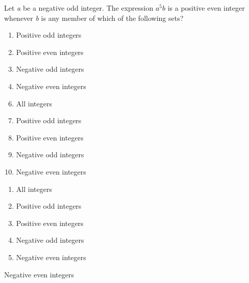 Let \textit{a} be a negative odd integer. The expression $\textit{a}^5\textit{b}$ is a positive even integer whenever \textit{b} is any member of which of the following sets?

\ifsat
	\begin{enumerate}[label=\Alph*)]
		\item  Positive odd integers
		\item  Positive even integers 
		\item  Negative odd integers
		\item  Negative even integers %
	\end{enumerate}
\else
\fi

\ifacteven
	\begin{enumerate}[label=\textbf{\Alph*.},itemsep=\fill,align=left]
		\setcounter{enumii}{5}
		\item   All integers
		\item  Positive odd integers
		\item  Positive even integers 
		\addtocounter{enumii}{1}
		\item  Negative odd integers
		\item  Negative even integers %
	\end{enumerate}
\else
\fi

\ifactodd
	\begin{enumerate}[label=\textbf{\Alph*.},itemsep=\fill,align=left]
		\item   All integers
		\item  Positive odd integers
		\item  Positive even integers 
		\item  Negative odd integers
		\item  Negative even integers %
	\end{enumerate}
\else
\fi

\ifgridin
  Negative even integers %

\else
\fi

